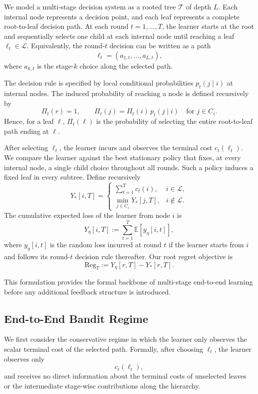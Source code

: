 We model a multi-stage decision system as a rooted tree $\mathcal{T}$ of depth $L$. Each internal node represents a decision point, and each leaf represents a complete root-to-leaf decision path. At each round $t = 1,\ldots,T$, the learner starts at the root and sequentially selects one child at each internal node until reaching a leaf $\ell_t \in \mathcal{L}$. Equivalently, the round-$t$ decision can be written as a path
\[
\ell_t = (a_{1,t}, \ldots, a_{L,t}),
\]
where $a_{k,t}$ is the stage-$k$ choice along the selected path.

The decision rule is specified by local conditional probabilities $p_t(j \mid i)$ at internal nodes. The induced probability of reaching a node is defined recursively by
\[
\Pi_t(r) = 1,
\qquad
\Pi_t(j) = \Pi_t(i)\, p_t(j \mid i)
\quad \text{for } j \in C_i.
\]
Hence, for a leaf $\ell$, $\Pi_t(\ell)$ is the probability of selecting the entire root-to-leaf path ending at $\ell$.

After selecting $\ell_t$, the learner incurs and observes the terminal cost $c_t(\ell_t)$. We compare the learner against the best stationary policy that fixes, at every internal node, a single child choice throughout all rounds. Such a policy induces a fixed leaf in every subtree. Define recursively
\[
Y_\ast[i,T] =
\begin{cases}
\sum_{t=1}^T c_t(i), & i \in \mathcal{L},\\[4pt]
\min_{j \in C_i} Y_\ast[j,T], & i \notin \mathcal{L}.
\end{cases}
\]
The cumulative expected loss of the learner from node $i$ is
\[
Y_\eta[i,T] := \sum_{t=1}^T \mathbb{E}[y_\eta[i,t]],
\]
where $y_\eta[i,t]$ is the random loss incurred at round $t$ if the learner starts from $i$ and follows its round-$t$ decision rule thereafter. Our root regret objective is
\[
\mathrm{Reg}_T := Y_\eta[r,T] - Y_\ast[r,T].
\]

This formulation provides the formal backbone of multi-stage end-to-end learning before any additional feedback structure is introduced.

\subsection{End-to-End Bandit Regime}

We first consider the conservative regime in which the learner only observes the scalar terminal cost of the selected path. Formally, after choosing $\ell_t$, the learner observes only
\[
c_t(\ell_t),
\]
and receives no direct information about the terminal costs of unselected leaves or the intermediate stage-wise contributions along the hierarchy.

